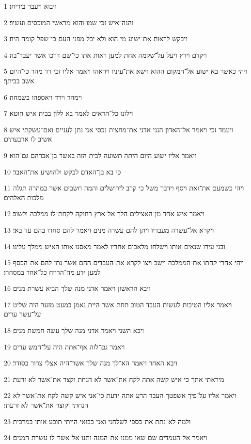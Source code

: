 \par 1 ויבוא ויעבר ביריחו׃
\par 2 והנה־איש זכי שמו והוא מראשי המוכסים ועשיר׃
\par 3 ויבקש לראות את־ישוע מי הוא ולא יכל מפני העם כי־שפל קומה היה׃
\par 4 ויקדם וירץ ויעל על־שקמה אחת למען ראות אתו כי־שם דרכו אשר יעבר־בה׃
\par 5 ויהי כאשר בא ישוע אל־המקום ההוא וישא את־עיניו ויראהו ויאמר אליו זכי רד מהר כי־היום אשב בביתך׃
\par 6 וימהר וירד ויאספהו בשמחה׃
\par 7 וילונו כל־הראים לאמר בא ללון בבית איש חוטא׃
\par 8 ויעמד זכי ויאמר אל־האדון הנני אדני את־מחצית נכסי אני נתן לעניים ואם־עשקתי איש אשיב לו ארבעתים׃
\par 9 ויאמר אליו ישוע היום היתה תשועה לבית הזה באשר בן־אברהם גם־הוא׃
\par 10 כי בא בן־האדם לבקש ולהושיע את־האבד׃
\par 11 ויהי כשמעם את־זאת ויסף וידבר משל כי קרב לירושלים והמה חשבים אשר במהרה תגלה מלכות האלהים׃
\par 12 ויאמר איש אחד מן־האצילים הלך אל־ארץ רחוקה לקחת־לו ממלכה ולשוב׃
\par 13 ויקרא אל־עשרה מעבדיו ויתן להם עשרה מנים ויאמר להם סחרו בהם עד באי׃
\par 14 ובני עירו שנאים אותו וישלחו מלאכים אחריו לאמר מאסנו אותו האיש ממלך עלינו׃
\par 15 ויהי אחרי קחתו את־הממלכה וישב ויצו לקרא את־העבדים ההם אשר נתן להם את־הכסף למען ידע מה־הרויח כל־אחד במסחרו׃
\par 16 ויבא הראשון ויאמר אדני מנה שלך הביא עשרת מנים׃
\par 17 ויאמר אליו הטיבות לעשות העבד הטוב תחת אשר היית נאמן במעט מזער היה שליט על־עשר ערים׃
\par 18 ויבא השני ויאמר אדני מנה שלך עשה חמשת מנים׃
\par 19 ויאמר גם־לזה אף־אתה היה על־חמש ערים׃
\par 20 ויבא האחר ויאמר הא־לך מנה שלך אשר־היה אצלי צרור בסודר׃
\par 21 מיראתי אתך כי איש קשה אתה לקח את־אשר לא הנחת וקצר את־אשר לא זרעת׃
\par 22 ויאמר אליו על־פיך אשפטך העבד הרע אתה ידעת כי־אני איש קשה לקח את־אשר לא הנחתי וקוצר את־אשר לא זרעתי׃
\par 23 ולמה לא־נתת את־כספי לשלחני ואני בבואי הייתי תובע אותו במרבית׃
\par 24 ויאמר אל־העמדים שם שאו ממנו את־המנה ותנו אל־אשר־לו עשרת המנים׃
